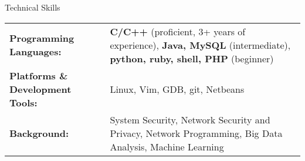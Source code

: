 \documentclass[11pt,oneside]{article}
\newenvironment{ressection_empty}[1]{
	\vspace{-1pt}
	{\fontfamily{phv}\selectfont\Large#1}
	
	\vspace{-8pt} \rule{\textwidth}{.5pt}
}
\newcommand{\resitem}[1]{
	\vspace{2pt}
	\item \begin{flushleft} #1 \end{flushleft}
}
\begin{document}
\begin{ressection_empty}{Technical Skills}
\vspace{-20pt}
\begin{table}[h]
\begin{tabular}[h]{p{}p{}}

\textbf{Programming Languages:} & \textbf{C/C++} (proficient, 3+ years of experience), \textbf{Java, MySQL} (intermediate), \textbf{python, ruby, shell, PHP} (beginner)	\\[1.5pt]
\textbf{Platforms \& Development Tools:} & Linux, Vim, GDB, git, Netbeans	\\[1.5pt]
\textbf{Background:} & System Security, Network Security and Privacy, Network Programming, Big Data Analysis, Machine Learning \\
\end{tabular}
\end{table}
\vspace{-8pt}

\begin{comment}
	\resitem{
		\textbf{Programming Languages:} \textbf{C/C++} (proficient, 3+ years of experience), \textbf{Java} (intermediate), \textbf{python, ruby, PHP} (beginner)
	}
	\vspace{-4pt}
	\resitem{
		\textbf{Platforms \& Development Tools:} Linux, Vim, GDB, git, Netbeans
	}
	\vspace{-4pt}
	\resitem{
		\textbf{Background:} System Security, Network Security and Privacy, Network Programming, Big Data Analysis, Machine Learning
	}
\end{comment}


\end{ressection_empty}
\end{document}

